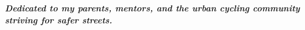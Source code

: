 \vspace*{\fill}
{\centering\Large\bfseries \textit{Dedicated to my parents, mentors, and the urban cycling community striving for safer streets.}\par}
\vspace*{\fill}
